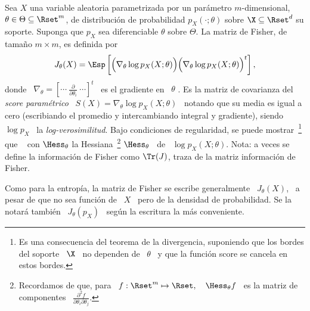 %
\begin{definicion}
  Sea   $X$   una   variable   aleatoria  parametrizada   por   un   par\'ametro
  $m$-dimensional, $\theta  \in \Theta \subseteq \Rset^m$,  de distribuci\'on de
  probabilidad $p_X(\cdot;\theta)$ 
  sobre $\X \subseteq  \Rset^d$ su soporte. Suponga que  $p_X$ sea diferenciable
    $\theta$  sobre  $\Theta$.  La  matriz  de Fisher,  de
  tama\~no $m \times m$, es definida por
  \[
  J_\theta(X)  =  \Esp\left[  \Big(  \nabla_\theta \log  p_X(X;\theta)  \Big)
    \Big( \nabla_\theta \log p_X(X;\theta) \Big)^t \right],
  \]
  donde \  $\nabla_\theta = \left[ \cdots  \: \frac{\partial}{\partial \theta_i}
    \: \cdots \right]^t$ \  es el gradiente en \ $\theta$ .   Es la  matriz de  covarianza  del {\it
    score param\'etrico}  \ $S(X) = \nabla_\theta \log  p_X(X;\theta)$ \ notando
  que  su  media es  igual  a cero  (escribiando  el  promedio y  intercambiando
  integral y gradiente), siendo \ $\log p_X$ \ la {\it log-verosimilitud}.  Bajo
  condiciones de regularidad, se puede mostrar~\footnote{Es una consecuencia del
    teorema de la divergencia, suponiendo que los bordes del soporte \ $\X$ \ no
    dependen  de \  $\theta$ \  y que  la funci\'on  score se  cancela  en estos
    bordes.}    que   \   \modif{$J_\theta(X)   =   -   \Esp[\Hess_\theta   \log
    p_X(X;\theta)]$}
    con  $\Hess_\theta$ la  Hessiana~\footnote{Recordamos  de que,  para \  $f:
      \Rset^m \mapsto \Rset, \quad \Hess_\theta f$ \ es la matriz de componentes
      \    $\frac{\partial^2   f}{\partial   \theta_i    \partial   \theta_j}$.}
    $\Hess_\theta$  \ de \  $\log p_X(X;\theta)$.   Nota: a  veces se  define la
    informaci\'on de Fisher  como $\Tr(J)$, traza de la  matriz informaci\'on de
    Fisher.
\end{definicion}
%
Como  para  la  entrop\'ia,  la  matriz  de Fisher  se  escribe  generalmente  \
$J_\theta(X)$, \ a pesar de que no sea  funci\'on de \ $X$ \ pero de la densidad
de  probabilidad.  Se  la  notar\'a  tambi\'en \  $J_\theta(p_X)$  \ seg\'un  la
escritura la m\'as conveniente.

